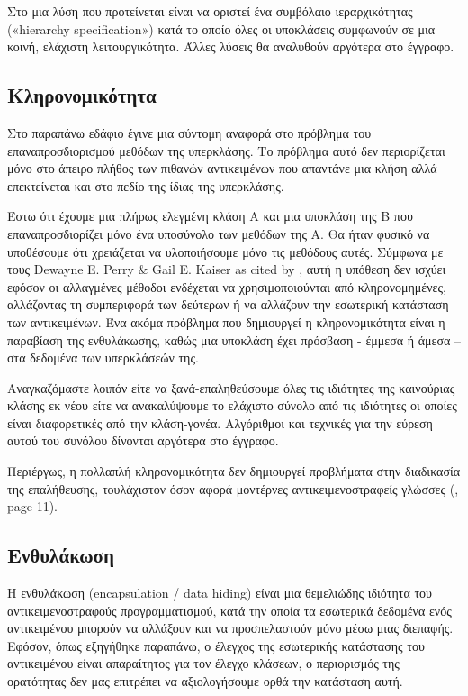 \documentclass[12pt]{article}
\begin{document}
\par Στο \textcite{chandra} μια λύση που προτείνεται είναι να οριστεί ένα συμβόλαιο ιεραρχικότητας («hierarchy specification») κατά το οποίο όλες οι υποκλάσεις συμφωνούν σε μια κοινή, ελάχιστη λειτουργικότητα. Άλλες λύσεις θα αναλυθούν αργότερα στο έγγραφο.

\subsection{Κληρονομικότητα}

Στο παραπάνω εδάφιο έγινε μια σύντομη αναφορά στο πρόβλημα του επαναπροσδιορισμού μεθόδων της υπερκλάσης. Το πρόβλημα αυτό δεν περιορίζεται μόνο στο άπειρο πλήθος των πιθανών αντικειμένων που απαντάνε μια κλήση αλλά επεκτείνεται και στο πεδίο της ίδιας της υπερκλάσης.

\par Έστω ότι έχουμε μια πλήρως ελεγμένη κλάση Α και μια υποκλάση της Β που επαναπροσδιορίζει μόνο ένα υποσύνολο των μεθόδων της Α. Θα ήταν φυσικό να υποθέσουμε ότι χρειάζεται να υλοποιήσουμε μόνο τις μεθόδους αυτές. Σύμφωνα με τους Dewayne E. Perry \& Gail E. Kaiser as cited by \textcite{barbey}, αυτή η υπόθεση δεν ισχύει εφόσον οι αλλαγμένες μέθοδοι ενδέχεται να χρησιμοποιούνται από κληρονομημένες, αλλάζοντας τη συμπεριφορά των δεύτερων ή να αλλάζουν την εσωτερική κατάσταση των αντικειμένων. Ένα ακόμα πρόβλημα που δημιουργεί η κληρονομικότητα είναι η παραβίαση της ενθυλάκωσης, καθώς μια υποκλάση έχει πρόσβαση - έμμεσα ή άμεσα – στα δεδομένα των υπερκλάσεών της. 

\par Αναγκαζόμαστε λοιπόν είτε να ξανά-επαληθεύσουμε όλες τις ιδιότητες της καινούριας κλάσης εκ νέου είτε να ανακαλύψουμε το ελάχιστο σύνολο από τις ιδιότητες οι οποίες είναι διαφορετικές από την κλάση-γονέα. Αλγόριθμοι και τεχνικές για την εύρεση αυτού του συνόλου δίνονται αργότερα στο έγγραφο.

\par Περιέργως, η πολλαπλή κληρονομικότητα δεν δημιουργεί προβλήματα στην διαδικασία της επαλήθευσης, τουλάχιστον όσον αφορά μοντέρνες αντικειμενοστραφείς γλώσσες (\textcite{barbey}, page 11).

\subsection{Ενθυλάκωση}

Η ενθυλάκωση (encapsulation / data hiding) είναι μια θεμελιώδης ιδιότητα του αντικειμενοστραφούς προγραμματισμού, κατά την οποία τα εσωτερικά δεδομένα ενός αντικειμένου μπορούν να αλλάξουν και να προσπελαστούν μόνο μέσω μιας διεπαφής. Εφόσον, όπως εξηγήθηκε παραπάνω, ο έλεγχος της εσωτερικής κατάστασης του αντικειμένου είναι απαραίτητος για τον έλεγχο κλάσεων, ο περιορισμός της ορατότητας δεν μας επιτρέπει να αξιολογήσουμε ορθά την κατάσταση αυτή. 
\end{document}
